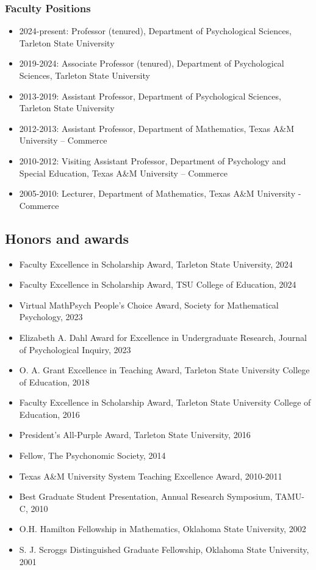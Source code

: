 \documentclass[article,10pt]{article}
\begin{document}
\subsubsection*{Faculty Positions}
\label{sec:org1107d4f}
\begin{itemize}
\item 2024-present: Professor (tenured), Department of Psychological Sciences, Tarleton State University
\item 2019-2024: Associate Professor (tenured), Department of Psychological Sciences, Tarleton State University
\item 2013-2019: Assistant Professor, Department of Psychological Sciences, Tarleton State University
\item 2012-2013: Assistant Professor, Department of Mathematics, Texas A\&M University – Commerce
\item 2010-2012: Visiting Assistant Professor, Department of Psychology and Special Education, Texas A\&M University – Commerce
\item 2005-2010: Lecturer, Department of Mathematics, Texas A\&M University - Commerce
\end{itemize}
\subsection*{Honors and awards}
\label{sec:org3c873ef}
\begin{itemize}
\item Faculty Excellence in Scholarship Award, Tarleton State University, 2024
\item Faculty Excellence in Scholarship Award, TSU College of Education, 2024
\item Virtual MathPsych People's Choice Award, Society for Mathematical Psychology, 2023
\item Elizabeth A. Dahl Award for Excellence in Undergraduate Research, Journal of Psychological Inquiry, 2023
\item O. A. Grant Excellence in Teaching Award, Tarleton State University College of Education, 2018
\item Faculty Excellence in Scholarship Award, Tarleton State University College of Education, 2016
\item President's All-Purple Award, Tarleton State University, 2016
\item Fellow, The Psychonomic Society, 2014
\item Texas A\&M University System Teaching Excellence Award, 2010-2011
\item Best Graduate Student Presentation, Annual Research Symposium, TAMU-C, 2010
\item O.H. Hamilton Fellowship in Mathematics, Oklahoma State University, 2002
\item S. J. Scroggs Distinguished Graduate Fellowship, Oklahoma State University, 2001
\end{itemize}
\end{document}
